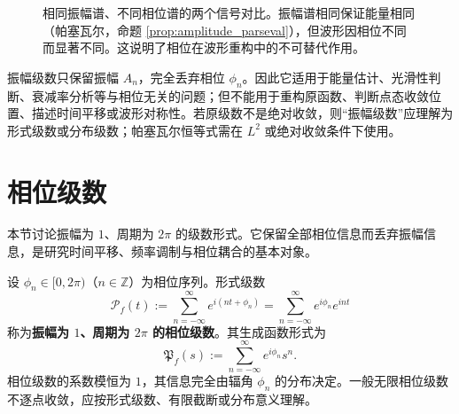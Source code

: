 \begin{figure}[htbp]
\centering
{}
\caption{相同振幅谱、不同相位谱的两个信号对比。振幅谱相同保证能量相同（帕塞瓦尔，命题 \ref{prop:amplitude_parseval}），但波形因相位不同而显著不同。这说明了相位在波形重构中的不可替代作用。}
\label{fig:same_amplitude_diff_phase}
\end{figure}

\begin{remark}[振幅级数的适用范围与注意事项]\label{rem:amplitude_series_scope}
振幅级数只保留振幅 $A_n$，完全丢弃相位 $\phi_n$。因此它适用于能量估计、光滑性判断、衰减率分析等与相位无关的问题；但不能用于重构原函数、判断点态收敛位置、描述时间平移或波形对称性。若原级数不是绝对收敛，则“振幅级数”应理解为形式级数或分布级数；帕塞瓦尔恒等式需在 $L^2$ 或绝对收敛条件下使用。
\end{remark}

\section{\texorpdfstring{相位级数}{相位级数}}

本节讨论振幅为 $1$、周期为 $2\pi$ 的级数形式。它保留全部相位信息而丢弃振幅信息，是研究时间平移、频率调制与相位耦合的基本对象。

\begin{definition}\label{def:phase_series}
设 $\phi_n \in [0,2\pi)$（$n \in \mathbb{Z}$）为相位序列。形式级数
\[
\mathcal{P}_f(t) := \sum_{n=-\infty}^{\infty} e^{i(nt+\phi_n)}
= \sum_{n=-\infty}^{\infty} e^{i\phi_n} e^{int}
\]
称为\textbf{振幅为 $1$、周期为 $2\pi$ 的相位级数}。其生成函数形式为
\[
\mathfrak{P}_f(s) := \sum_{n=-\infty}^{\infty} e^{i\phi_n} s^n.
\]
相位级数的系数模恒为 $1$，其信息完全由辐角 $\phi_n$ 的分布决定。一般无限相位级数不逐点收敛，应按形式级数、有限截断或分布意义理解。
\end{definition}

